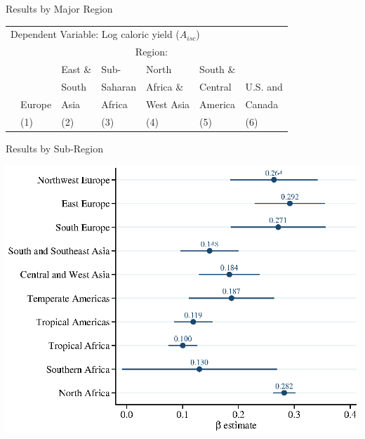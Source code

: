 \documentclass[10pt, xcolor=dvipsnames]{beamer}
\begin{document}
\begin{frame}{Results by Major Region}\label{regiontab}

{\scriptsize
\begin{tabularx}{\textwidth}{lXXXXXX}
\midrule
\multicolumn{7}{l}{Dependent Variable: Log caloric yield ($A_{isc}$)} \\
 & \multicolumn{6}{c}{Region:} \\ \cmidrule{2-7}
 &        & East \& & Sub-        & North     & South \&  &  \\
 &        & South   & Saharan     & Africa \& & Central   & U.S. and \\
 & Europe & Asia    & Africa      & West Asia & America   & Canada \\
 & (1) & (2) & (3) & (4) & (5) & (6) \\
\midrule

\midrule
\end{tabularx}
}
\end{frame}

\begin{frame}{Results by Sub-Region}
\begin{center}
\includegraphics[width=.8\textwidth]{fig_coef_subregion.eps}
\end{center}
\end{frame}
\end{document}
